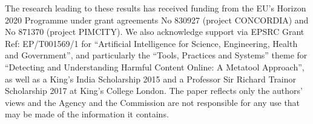 \documentclass{article}
\begin{document}
The research leading to these results has received funding from the EU's Horizon 2020 Programme under grant agreements No 830927 (project CONCORDIA) and No 871370 (project PIMCITY). We also acknowledge  support via  EPSRC Grant Ref: EP/T001569/1 for ``Artificial Intelligence for Science, Engineering, Health and Government'', and particularly the ``Tools, Practices and Systems'' theme for ``Detecting and Understanding Harmful Content Online: A Metatool Approach'', as well as a King's India Scholarship 2015 and a Professor Sir Richard Trainor Scholarship 2017 at King's College London.
The paper reflects only the authors' views and the Agency and the Commission are not responsible for any use that may be made of the information it contains.



  


\end{document}
